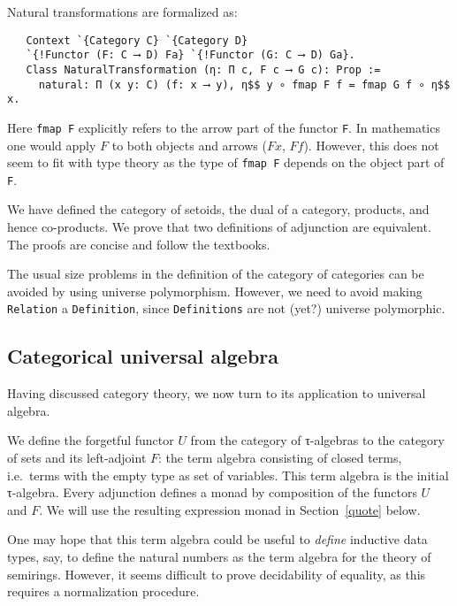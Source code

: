 \documentclass[a4paper,10pt,runningheads]{llncs}
\begin{document}
Natural transformations are formalized as:
\begin{lstlisting}
   Context `{Category C} `{Category D}
   `{!Functor (F: C ⟶ D) Fa} `{!Functor (G: C ⟶ D) Ga}.
   Class NaturalTransformation (η: Π c, F c ⟶ G c): Prop :=
     natural: Π (x y: C) (f: x ⟶ y), η$$ y ∘ fmap F f = fmap G f ∘ η$$ x.
\end{lstlisting}
 
Here \lstinline|fmap F| explicitly refers to the arrow part of the functor \lstinline|F|.
In mathematics one would apply $F$ to both objects and arrows ($F x$, $F f$). However, this does
not seem to fit with type theory as the type of \lstinline|fmap F| depends on the object part of
\lstinline|F|.

We have defined the category of setoids, the dual of a category, products, and hence co-products. 
We prove that two definitions of adjunction are equivalent. The proofs are concise and follow the textbooks.

The usual size problems in the definition of the category of categories can be avoided by using universe polymorphism. 
However, we need to avoid making \lstinline|Relation| a \lstinline|Definition|, since \lstinline|Definitions| are not (yet?) universe polymorphic.

\subsection{Categorical universal algebra}
Having discussed category theory, we now turn to its application to universal algebra.

We define the forgetful functor $U$ from the category of τ-algebras to the category of sets and its left-adjoint $F$: the term algebra consisting of closed terms, i.e.\ terms with the empty type as set of variables. This term algebra is the initial τ-algebra. Every adjunction defines a monad by composition of the functors $U$ and $F$. We will use the resulting expression monad in Section~\ref{quote} below.


One may hope that this term algebra could be useful to \emph{define} inductive data types, say, to define the natural numbers 
as the term algebra for the theory of semirings. However, it seems difficult to prove decidability of equality, 
as this requires a normalization procedure.
\end{document}
